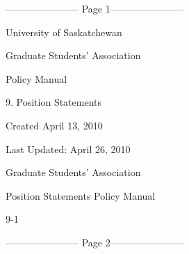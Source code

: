 ﻿----------------------- Page 1-----------------------

  



  



                                                          



                             University of Saskatchewan   



                         Graduate Students’ Association  



                                                          



                                                                               

                                                          



                                          Policy Manual   



                                  9. Position Statements  



                                                          



                                                          



                                                          



Created April 13, 2010  



Last Updated: April 26, 2010  



                                    Graduate Students’ Association  

                                   



                                  Position Statements Policy Manual  



                                                      9-1  


----------------------- Page 2-----------------------

